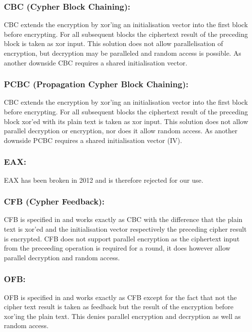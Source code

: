 \subsubsection{CBC (Cypher Block Chaining):}  CBC extends the encryption by xor'ing an initialisation vector into the first block before encrypting. For all subsequent blocks the ciphertext result of the preceding block is taken as xor input. This solution does not allow parallelisation of encryption, but decryption may be paralleled and random access is possible. As another downside CBC requires a shared initialisation vector. 

\subsubsection{PCBC (Propagation Cypher Block Chaining):}  CBC extends the encryption by xor'ing an initialisation vector into the first block before encrypting. For all subsequent blocks the ciphertext result of the preceding block xor'ed with its plain text is taken as xor input. This solution does not allow parallel decryption or encryption, nor does it allow random access. As another downside PCBC requires a shared initialisation vector (IV). 

\subsubsection{EAX:} EAX has been broken in 2012\cite{minematsu2013attacks} and is therefore rejected for our use.

\subsubsection{CFB (Cypher Feedback):} CFB is specified in \cite{dworkin2001recommendation} and works exactly as CBC with the difference that the plain text is xor'ed and the initialisation vector respectively the preceding cipher result is encrypted. CFB does not support parallel encryption as the ciphertext input from the preceeding operation is required for a round, it does however allow parallel decryption and random access.

\subsubsection{OFB:} OFB is specified in \cite{dworkin2001recommendation} and works exactly as CFB except for the fact that not the cipher text result is taken as feedback but the result of the encryption before xor'ing the plain text. This denies parallel encryption and decryption as well as random access.

